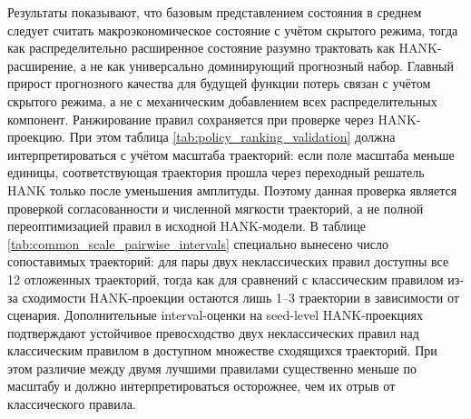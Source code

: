 \begin{table}[htbp]
\centering
\small
\caption{Сохранение ранжирования правил при проверке через HANK-проекцию}
\label{tab:policy_ranking_validation}

\end{table}

\begin{table}[htbp]
\centering
\small
\caption{Попарные разности потерь в common-scale HANK-проекции}
\label{tab:common_scale_pairwise_intervals}

\end{table}

\begin{table}[htbp]
\centering
\small
\caption{Чувствительность ранжирования к масштабу HANK-проекции}
\label{tab:common_scale_sensitivity}

\end{table}

Результаты показывают, что базовым представлением состояния в среднем следует считать макроэкономическое состояние с учётом скрытого режима, тогда как распределительно расширенное состояние разумно трактовать как HANK-расширение, а не как универсально доминирующий прогнозный набор. Главный прирост прогнозного качества для будущей функции потерь связан с учётом скрытого режима, а не с механическим добавлением всех распределительных компонент. Ранжирование правил сохраняется при проверке через HANK-проекцию. При этом таблица \ref{tab:policy_ranking_validation} должна интерпретироваться с учётом масштаба траекторий: если поле масштаба меньше единицы, соответствующая траектория прошла через переходный решатель HANK только после уменьшения амплитуды. Поэтому данная проверка является проверкой согласованности и численной мягкости траекторий, а не полной переоптимизацией правил в исходной HANK-модели. В таблице \ref{tab:common_scale_pairwise_intervals} специально вынесено число сопоставимых траекторий: для пары двух неклассических правил доступны все 12 отложенных траекторий, тогда как для сравнений с классическим правилом из-за сходимости HANK-проекции остаются лишь 1--3 траектории в зависимости от сценария. Дополнительные interval-оценки на seed-level HANK-проекциях подтверждают устойчивое превосходство двух неклассических правил над классическим правилом в доступном множестве сходящихся траекторий. При этом различие между двумя лучшими правилами существенно меньше по масштабу и должно интерпретироваться осторожнее, чем их отрыв от классического правила.
